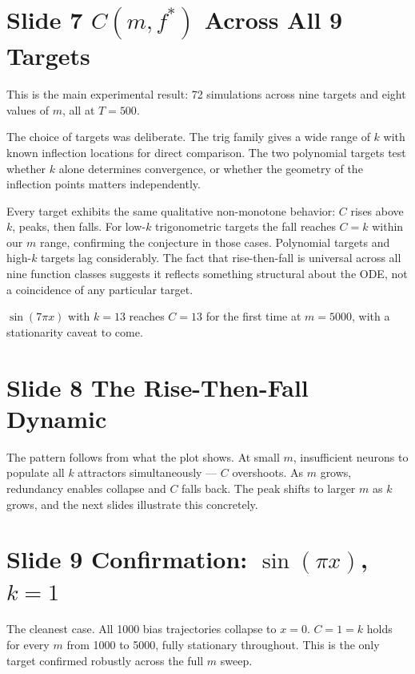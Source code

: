 \documentclass[11pt]{article}
\begin{document}
\section*{Slide 7 \quad $C(m,f^*)$ Across All 9 Targets}

This is the main experimental result: 72 simulations across nine targets and eight values of $m$, all at $T = 500$.

The choice of targets was deliberate.
The trig family gives a wide range of $k$ with known inflection locations for direct comparison.
The two polynomial targets test whether $k$ alone determines convergence, or whether the geometry of the inflection points matters independently.

Every target exhibits the same qualitative non-monotone behavior: $C$ rises above $k$, peaks, then falls.
For low-$k$ trigonometric targets the fall reaches $C = k$ within our $m$ range, confirming the conjecture in those cases.
Polynomial targets and high-$k$ targets lag considerably.
The fact that rise-then-fall is universal across all nine function classes suggests it reflects something structural about the ODE, not a coincidence of any particular target.

$\sin(7\pi x)$ with $k = 13$ reaches $C = 13$ for the first time at $m = 5000$, with a stationarity caveat to come.

\section*{Slide 8 \quad The Rise-Then-Fall Dynamic}

The pattern follows from what the plot shows.
At small $m$, insufficient neurons to populate all $k$ attractors simultaneously --- $C$ overshoots.
As $m$ grows, redundancy enables collapse and $C$ falls back.
The peak shifts to larger $m$ as $k$ grows, and the next slides illustrate this concretely.

\section*{Slide 9 \quad Confirmation: $\sin(\pi x)$, $k = 1$}

The cleanest case.
All 1000 bias trajectories collapse to $x = 0$.
$C = 1 = k$ holds for every $m$ from 1000 to 5000, fully stationary throughout.
This is the only target confirmed robustly across the full $m$ sweep.
\end{document}
